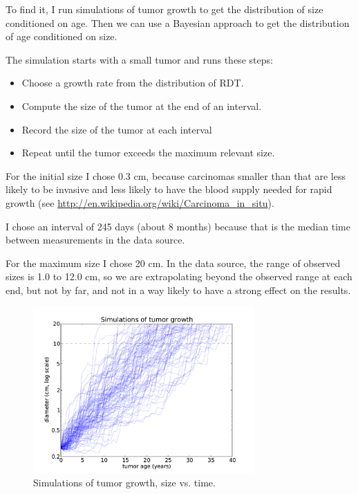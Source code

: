 \documentclass[12pt]{book}
\begin{document}
To find it, I run simulations of tumor growth to get the
distribution of size conditioned on age.  Then we can use
a Bayesian approach to get the
distribution of age conditioned on size.

The simulation starts with a small tumor and runs these steps:

\begin{itemize}

\item Choose a growth rate from the distribution of RDT.

\item Compute the size of the tumor at the end of an interval.

\item Record the size of the tumor at each interval

\item Repeat until the tumor exceeds the maximum relevant size.

\end{itemize}

For the initial size I chose 0.3 cm, because carcinomas smaller than
that are less likely to be invasive and less likely to have the blood
supply needed for rapid growth (see
\url{http://en.wikipedia.org/wiki/Carcinoma_in_situ}).  

I chose an interval of 245 days (about 8 months) because that is the
median time between measurements in the data source.

For the maximum size I chose 20 cm.  In the data source, the range of
observed sizes is 1.0 to 12.0 cm, so we are extrapolating beyond
the observed range at each end, but not by far, and not in a way
likely to have a strong effect on the results.

\begin{figure}
\centerline{\includegraphics[height=2.5in]{figs/kidney4.pdf}}
\caption{Simulations of tumor growth, size vs. time.}
\label{fig.kidney4}
\end{figure}
\end{document}
